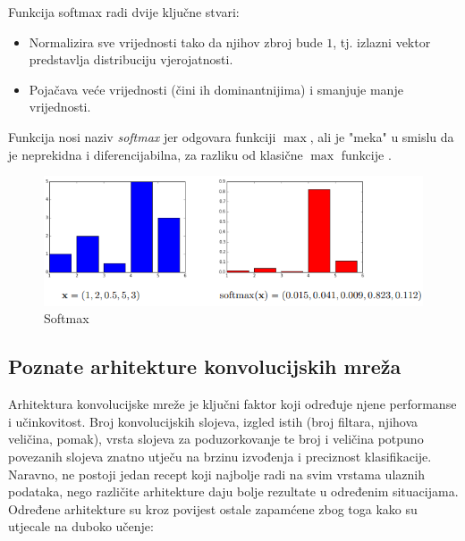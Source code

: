 Funkcija softmax radi dvije ključne stvari:
\begin{itemize}
    \item Normalizira sve vrijednosti tako da njihov zbroj bude \( 1 \), tj. izlazni vektor 
        predstavlja distribuciju vjerojatnosti.
    \item Pojačava veće vrijednosti (čini ih dominantnijima) i smanjuje manje vrijednosti.
\end{itemize}

Funkcija nosi naziv \textit{softmax} jer odgovara funkciji \( \max \), ali je "meka" u smislu
da je neprekidna i diferencijabilna, za razliku od klasične \( \max \) funkcije 
\cite{snajder2023logreg}.

\begin{figure}[htb]
    \centering
    \includegraphics[width=0.6\linewidth]{Chapters/neuronska_mreza/CNN/softmax.png} 
    \caption{Softmax \cite{snajder2023logreg}}
    \label{pic:softmax}
\end{figure}


\subsection{Poznate arhitekture konvolucijskih mreža}
Arhitektura konvolucijske mreže je ključni faktor koji određuje njene performanse i
učinkovitost. Broj konvolucijskih slojeva, izgled istih (broj filtara, njihova veličina,
pomak), vrsta slojeva za poduzorkovanje te broj i veličina potpuno povezanih slojeva znatno
utječu na brzinu izvođenja i preciznost klasifikacije. Naravno, ne postoji jedan recept koji
najbolje radi na svim vrstama ulaznih podataka, nego različite arhitekture daju bolje rezultate
u određenim situacijama. Određene arhitekture su kroz povijest ostale zapamćene zbog
toga kako su utjecale na duboko učenje\cite{indian}:

